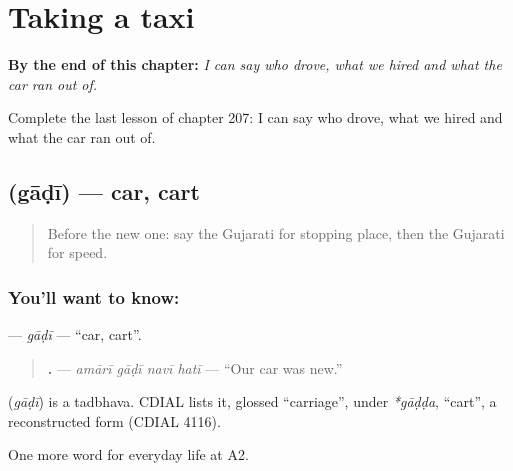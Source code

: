 
\chapter{Taking a taxi}
\label{ch:gu-taking-a-taxi}

\begin{chapteropening}
\textbf{By the end of this chapter:} \emph{I can say who drove, what we hired and what the car ran out of.}

Complete the last lesson of chapter 207: I can say who drove, what we hired and what the car ran out of.
\end{chapteropening}

\section[\texorpdfstring{\gu{ગાડી} (gāḍī)}{ગાડી (gāḍī)}]{ (gāḍī) — car, cart}

\label{lesson:GU-C207-gadi}



\begin{quote}
Before the new one: say the Gujarati for stopping place, then the Gujarati for speed.
\end{quote}

\subsection*{You'll want to know: }
\textbf{} — \emph{gāḍī} — \textquotedblleft{}car, cart\textquotedblright{}.

\begin{quote}
\textbf{   .} — \emph{amārī gāḍī navī hatī} — \textquotedblleft{}Our car was new.\textquotedblright{}
\end{quote}

\begin{cousinweb}
\textbf{} (\emph{gāḍī}) is a tadbhava. CDIAL lists it, glossed \textquotedblleft{}carriage\textquotedblright{}, under \emph{*gāḍḍa}, \textquotedblleft{}cart\textquotedblright{}, a reconstructed form (CDIAL 4116).
\end{cousinweb}

\begin{grammarlens}[title={What you've built}]
One more word for everyday life at A2.
\end{grammarlens}

